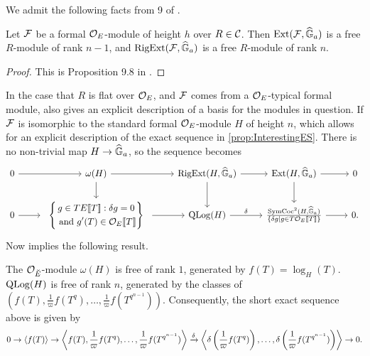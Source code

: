 \documentclass[../main.tex]{subfiles}
\begin{document}
We admit the following facts from  9 of \cite{hopkins1994equivariant}.
\begin{prop}\label{prop:InterestingSequenceStdMod}
  Let $\mathcal{F}$ be a formal ${\mathcal{O}_E}$-module of height $h$ over $R \in \mathcal{C}$. 
  Then $\operatorname{Ext}(\mathcal{F}, \widehat{\mathbb{G}}_a)$ is a free $R$-module of rank $n-1$, 
  and $\operatorname {RigExt}(\mathcal{F}, \widehat{\mathbb{G}}_a)$ is a free $R$-module of rank $n$. 
\begin{proof}
  This is Proposition 9.8 in \cite{hopkins1994equivariant}. \end{proof}
\end{prop}

In the case that $R$ is flat over $\mathcal{O}_E$, and $\mathcal{F}$ comes from a 
$\mathcal{O}_E$-typical formal module, \cite[ 9]{hopkins1994equivariant} also
gives an explicit description of a basis for the modules in question.
If $\mathcal{F}$ is isomorphic to the standard formal $\mathcal{O}_E$-module $H$ of height $n$,
which allows for an explicit
description of the exact sequence in \cref{prop:InterestingES}.  
There is no non-trivial map $H \to \widehat{\mathbb{G}}_a$, so the sequence becomes
\begin{equation*}
\begin{tikzcd}[ampersand replacement=\&]
	0 \& {\omega(H)} \& {\RigExt(H,\Ghat_a)} \& {\Ext(H,\Ghat_a)} \& 0 \\
	0 \& \begin{array}{c} \left\{\begin{gathered} {g \in TE\llbr T \rrbr : \delta g = 0} \\          \text{ and $g'(T) \in \cO_E\llbr T \rrbr$}\end{gathered} \right\} \end{array} \& {\QLog(H)} \& {\frac{\SymCoc^2(H, \Ghat_a)}{\{\delta g \mid g \in T \cO_E\llbr T \rrbr\}}} \& 0.
	\arrow[from=1-1, to=1-2]
	\arrow[from=1-2, to=1-3]
	\arrow[from=1-2, to=2-2]
	\arrow[from=1-3, to=1-4]
	\arrow[from=1-3, to=2-3]
	\arrow[from=1-4, to=1-5]
	\arrow[from=1-4, to=2-4]
	\arrow["", from=2-1, to=2-2]
	\arrow[from=2-2, to=2-3]
	\arrow["\delta", from=2-3, to=2-4]
	\arrow[from=2-4, to=2-5]
\end{tikzcd}   
\end{equation*}
Now \cite[Proposition 9.8]{hopkins1994equivariant} implies the following result.
\begin{prop}
  The $\mathcal{O}_{\breve {E}}$-module $\omega(H)$ is free of rank $1$, generated by 
  $f(T) = \log_H(T)$. $\operatorname {QLog}(H)$ is free of rank $n$, generated by the classes of
  $(f(T), \frac 1\varpi f(T^q), \dots, \frac 1\varpi f(T^{q^{n-1}}))$. Consequently,
  the short exact sequence above is given by 
  \begin{equation*}
    0 \to \left \langle f(T) \right \rangle \to \left \langle f(T), \frac 1\varpi
      f(T^q) , \dots,
    \frac 1\varpi f(T^{q^{n-1}}) \right \rangle \xrightarrow{\delta} 
    \left \langle \delta \left(\frac 1\varpi f(T^q)\right),\dots, \delta
    \left(\frac 1\varpi f(T^{q^{n-1}})\right ) \right \rangle \to 0.
  \end{equation*}
\end{prop}
\end{document}
